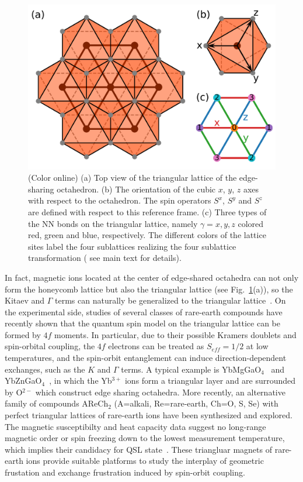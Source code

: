 \documentclass[aps,prb,reprint,amsfonts,amsmath,amssymb,showpacs,groupedaddress,superscriptaddress]{revtex4-1}
\begin{document}
\begin{figure}
    \centering
    \includegraphics[width=\columnwidth]{fig/ModelDefinition.pdf}
    \caption{\label{fig:ModelDefinition}(Color online) (a) Top view of the triangular lattice of the edge-sharing octahedron. (b) The orientation of the cubic $x$, $y$, $z$ axes with respect to the octahedron. The spin operators $S^x$, $S^y$ and $S^z$ are defined with respect to this reference frame. (c) Three types of the NN bonds on the triangular lattice, namely $\gamma=x, y, z$ colored red, green and blue, respectively. The different colors of the lattice sites label the four sublattices realizing the four sublattice transformation ( see main text for details).}
\end{figure}
In fact, magnetic ions located at the center of edge-shared octahedra can not only form the honeycomb lattice but also the triangular lattice (see Fig.~\ref{fig:ModelDefinition}(a)), so the Kitaev and $\Gamma$ terms can naturally be generalized to the triangular lattice~\cite{PhysRevB.89.014414,PhysRevB.93.104417}.
On the experimental side, studies of several classes of rare-earth compounds have recently shown that the quantum spin model on the triangular lattice can be formed by $4f$ moments. In particular, due to their possible Kramers doublets and spin-orbital coupling, the $4f$ electrons can be treated as $S_{eff}=1/2$ at low temperatures, and the spin-orbit entanglement can induce direction-dependent exchanges, such as the $K$ and $\Gamma$ terms. A typical example is YbMgGaO$_{4}$~\cite{srep16419,PhysRevLett.115.167203} and YbZnGaO$_{4}$~\cite{PhysRevLett.120.087201}, in which the Yb$^{3+}$ ions form a triangular layer and are surrounded by O$^{2-}$ which construct edge sharing octahedra. More recently, an alternative family of compounds AReCh$_2$ (A=alkali, Re=rare-earth, Ch=O, S, Se) with perfect triangular lattices of rare-earth ions have been synthesized and explored. The magnetic susceptibilty and heat capacity data suggest no long-range magnetic order or spin freezing down to the lowest measurement temperature, which implies their candidacy for QSL state~\cite{acsmaterialslett.9b00464,PhysRevMaterials.3.114413,PhysRevB.100.241116,Liu_2018,PhysRevB.99.180401,PhysRevB.100.224417,PhysRevB.100.144432}. These triangluar magnets of rare-earth ions provide suitable platforms to study the interplay of geometric frustation and exchange frustration induced by spin-orbit coupling.
\end{document}
